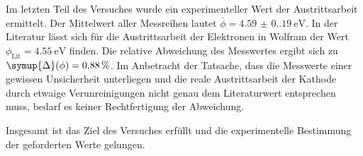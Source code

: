 Im letzten Teil des Versuches wurde ein experimenteller Wert der Austrittsarbeit ermittelt. Der Mittelwert aller Messreihen lautet 
$\overline{\phi} = \qty{4.59(0.19)}{\electronvolt}$. In der Literatur lässt sich für die Austrittsarbeit der Elektronen in Wolfram der Wert 
$\phi_\text{Lit} = \qty{4.55}{\electronvolt}$ \cite{Ingenieurwissen} finden. Die relative Abweichung des Messwertes ergibt sich zu 
$\symup{\Delta} (\phi) = \qty{0.88}{\percent}$. Im Anbetracht der Tatsache, dass die Messwerte einer gewissen Unsicherheit unterliegen und die reale Austrittsarbeit
der Kathode durch etwaige Verunreinigungen nicht genau dem Literaturwert entsprechen muss, bedarf es keiner Rechtfertigung der Abweichung. 

Insgesamt ist das Ziel des Versuches erfüllt und die experimentelle Bestimmung der geforderten Werte gelungen.
